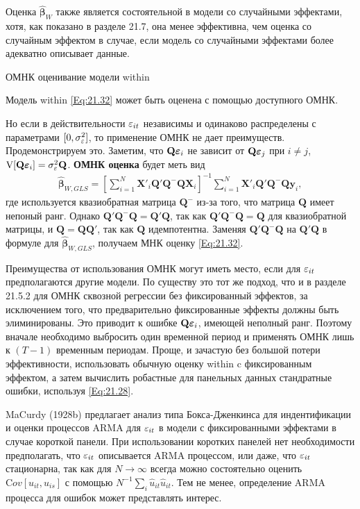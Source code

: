 Оценка $\hat{\bm\beta}_W$ также является состоятельной в модели со случайными эффектами, хотя, как показано в разделе 21.7, она менее эффективна, чем оценка со случайным эффектом в случае, если модель со случайными эффектами более адекватно описывает данные.

{\centering
ОМНК оценивание модели within\\}

Модель within \ref{Eq:21.32} может быть оценена с помощью доступного ОМНК.

Но если в действительности $\varepsilon_{it}$  независимы и одинаково распределены с параметрами $[0, \sigma^2_\varepsilon]$, то применение ОМНК не дает преимуществ. Продемонстрируем это. Заметим, что $\mathbf Q \bm{\varepsilon}_i$ не зависит от $\mathbf Q \bm{\varepsilon}_j$ при $i \neq j$, $\mathrm V[\mathbf Q \bm{\varepsilon}_i]=\sigma^2_\varepsilon \mathbf Q$.     \textbf{ОМНК оценка} будет меть вид
\begin{align}
\hat{\bm\beta}_{W,GLS}=\left[ \sum_{i=1}^N \mathbf X'_i \mathbf Q' \mathbf Q^{-} \mathbf Q \mathbf X_i \right]^{-1} 
\sum_{i=1}^N \mathbf X'_i \mathbf Q' \mathbf Q^{-} \mathbf Q \mathbf y_i,
\nonumber
\end{align}
где используется квазиобратная матрица $\mathbf Q^-$ из-за того, что матрица  $\mathbf Q$ имеет непоный ранг. Однако $\mathbf Q' \mathbf Q^{-} \mathbf Q =\mathbf Q' \mathbf Q$, так как $\mathbf Q' \mathbf Q^{-} \mathbf Q = \mathbf Q$ для квазиобратной матрицы, и $\mathbf Q= \mathbf Q \mathbf Q'$, так как $\mathbf Q$ идемпотентна. Заменяя  $\mathbf Q' \mathbf Q^{-} \mathbf Q $ на $\mathbf Q' \mathbf Q$ в формуле для $\hat{\bm\beta}_{W,GLS}$, получаем МНК оценку \ref{Eq:21.32}.

Преимущества от использования ОМНК могут иметь место, если для $\varepsilon_{it}$ предполагаются другие модели. По существу это тот же подход, что и в разделе 21.5.2 для ОМНК сквозной регрессии без фиксированный эффектов, за исключением того, что предварительно фиксированные эффекты должны быть элиминированы. Это приводит к ошибке $\mathbf Q\bm{\varepsilon}_i$, имеющей неполный ранг. Поэтому вначале необходимо выбросить один временной период и применять ОМНК лишь к $(T-1)$ временным периодам. Проще, и зачастую без большой потери эффективности, использовать обычную оценку within c фиксированным эффектом, а затем вычислить робастные для панельных данных стандратные ошибки, используя \ref{Eq:21.28}.

MaCurdy (1928b) предлагает анализ типа Бокса-Дженкинса для индентификации и оценки процессов ARMA для $\varepsilon_{it}$ в модели с фиксированными эффектами в случае короткой панели. При использовании коротких панелей нет необходимости предполагать, что $\varepsilon_{it}$ описывается ARMA процессом, или даже, что $\varepsilon_{it}$ стационарна, так как для $N \rightarrow \infty$ всегда можно состоятельно оценить $\mathrm Cov[u_{it}, u_{is}]$ с помощью $N^{-1}\sum_i \hat{u}_{it}\hat{u}_{it}$. Тем не менее, определение ARMA процесса для ошибок может представлять интерес.


